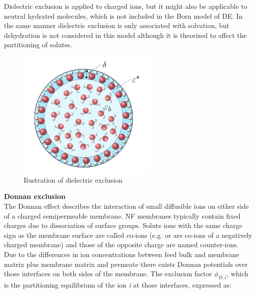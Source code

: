 Dielectric exclusion is applied to charged ions, but it might also be applicable to neutral hydrated molecules, which is not included in the Born model of DE.
In the same manner dielectric exclusion is only associated with solvation, but dehydration is not considered in this model although it is theorized to affect the partitioning of solutes. \citep{wangPoreModelNanofiltration2021} 

\begin{figure}[H]
    \centering
    \includegraphics[width=0.6\textwidth]{Billeder/teori/Dielectric_exclusion.png}
    \caption{Ilustration of dielectric exclusion}
    \label{fig:dielectric_exclusion}
\end{figure}


\textbf{Donnan exclusion}\\
The Donnan effect describes the interaction of small diffusible ions on either side of a charged semipermeable membrane. 
NF membranes typically contain fixed charges due to dissociation of surface groups. 
Solute ions with the same charge sign as the membrane surface are called co-ions (e.g.  or   are co-ions of a negatively charged membrane) and those of the opposite charge are named counter-ions.
Due to the differences in ion concentrations between feed bulk and membrane matrix plus membrane matrix and permeate there exists Donnan potentials over those interfaces on both sides of the membrane. \citep{wangPoreModelNanofiltration2021}
The exclusion factor $\phi_{D,i}$, which is the partitioning equilibrium of the ion \textit{i} at those interfaces,  expressed as: \citep{wangPoreModelNanofiltration2021}



